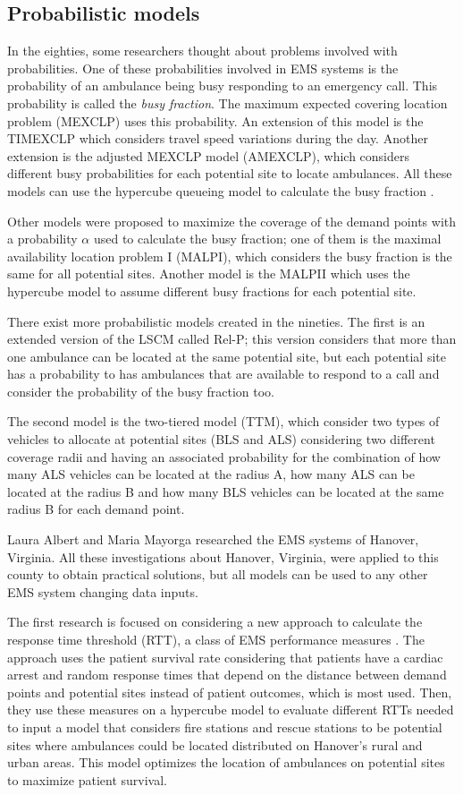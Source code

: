 \subsection{Probabilistic models}

In the eighties, some researchers thought about problems involved with probabilities. One of these probabilities involved in EMS systems is the probability of an ambulance being busy responding to an emergency call. This probability is called the \textit{busy fraction}. The maximum expected covering location problem (MEXCLP) uses this probability. An extension of this model is the TIMEXCLP which considers travel speed variations during the day. Another extension is the adjusted MEXCLP model (AMEXCLP), which considers different busy probabilities for each potential site to locate ambulances. All these models can use the hypercube queueing model to calculate the busy fraction \cite{galvao2008emergency}.

Other models were proposed to maximize the coverage of the demand points with a probability $\alpha$ used to calculate the busy fraction; one of them is the maximal availability location problem I (MALPI), which considers the busy fraction is the same for all potential sites. Another model is the MALPII which uses the hypercube model to assume different busy fractions for each potential site.

There exist more probabilistic models created in the nineties. The first is an extended version of the LSCM called Rel-P; this version considers that more than one ambulance can be located at the same potential site, but each potential site has a probability to has ambulances that are available to respond to a call and consider the probability of the busy fraction too. 

The second model is the two-tiered model (TTM), which consider two types of vehicles to allocate at potential sites (BLS and ALS) considering two different coverage radii and having an associated probability for the combination of how many ALS vehicles can be located at the radius A, how many ALS can be located at the radius B and how many BLS vehicles can be located at the same radius B for each demand point. 

Laura Albert and Maria Mayorga researched the EMS systems of Hanover, Virginia. All these investigations about Hanover, Virginia, were applied to this county to obtain practical solutions, but all models can be used to any other EMS system changing data inputs.

The first research is focused on considering a new approach to calculate the response time threshold (RTT), a class of EMS performance measures \cite{mclay2010evaluating}. The approach uses the patient survival rate considering that patients have a cardiac arrest and random response times that depend on the distance between demand points and potential sites instead of patient outcomes, which is most used. Then, they use these measures on a hypercube model to evaluate different RTTs needed to input a model that considers fire stations and rescue stations to be potential sites where ambulances could be located distributed on Hanover's rural and urban areas. This model optimizes the location of ambulances on potential sites to maximize patient survival. 

